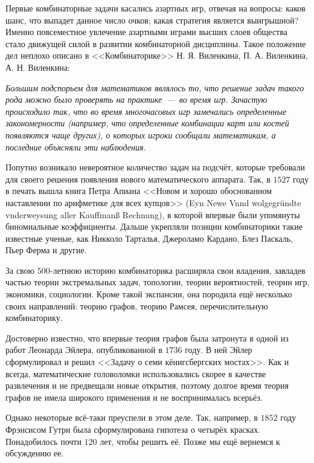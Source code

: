 	Первые комбинаторные задачи касались азартных игр, отвечая на вопросы: каков шанс, что выпадет данное число очков; 
	какая стратегия является выигрышной? Именно повсеместное увлечение азартными играми высших слоев общества стало движущей силой в
	развитии комбинаторной дисциплины. Такое положение дел неплохо описано в <<Комбинаторике>> Н. Я. Виленкина, П. А. Виленкина, А. Н. Виленкина:
	
\begin{displayquote}
	\textit{Большим подспорьем для математиков являлось то, что решение задач такого рода можно было проверять на практике~---~во время игр. 
	Зачастую происходило так, что во время многочасовых игр замечались определенные закономерности (например, что определенные комбинации карт 
	или костей появляются чаще других), о которых игроки сообщали математикам, а последние объясняли эти наблюдения.}
\end{displayquote}

	Попутно возникало невероятное количество задач на подсчёт, которые требовали для своего решения появления нового математического аппарата. 
	Так, в $1527$ году в печать вышла книга Петра Апиана <<Новом и хорошо обоснованном наставлении по арифметике для всех купцов>> 
	(Eyn Newe Vnnd wolgegründte vnderweysung aller Kauffmanß Rechnung), в которой впервые были упомянуты биномиальные коэффициенты. Дальше укрепляли
	позиции комбинаторики такие известные ученые, как Никколо Тарталья, Джероламо Кардано, Блез Паскаль, Пьер Ферма и другие.
	
	За свою $500$-летнюю историю комбинаторика расширяла свои владения, завладев частью теории экстремальных задач, топологии, теории вероятностей, 
	теории игр, экономики, социологии. Кроме такой экспансии, она породила ещё несколько своих направлений: 
	теорию графов, теорию Рамсея, перечислительную комбинаторику.
	
	Достоверно известно, что впервые теория графов была затронута в одной из работ Леонарда Эйлера, опубликованной в $1736$ году. 
	В ней Эйлер сформулировал и решил <<Задачу о семи кёнигсбергских мостах>>. Как и всегда, математические головоломки использовались 
	скорее в качестве развлечения и не предвещали новые открытия, поэтому долгое время теория графов не имела широкого применения 
	и не воспринималась всерьёз.  

	Однако некоторые всё-таки преуспели в этом деле. Так, например, в $1852$ году Фрэнсисом Гутри была сформулирована гипотеза о четырёх красках.
	Понадобилось почти $120$ лет, чтобы решить её. Позже мы ещё вернемся к обсуждению ее.
	
